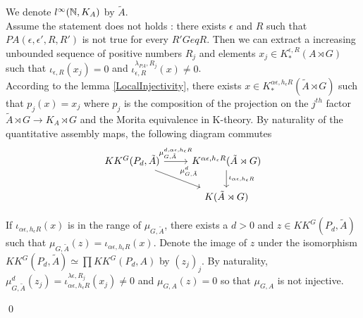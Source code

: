 \begin{dem}
We denote $l^\infty(\mathbb N,K_A)$ by $\tilde A$.\\
Assume the statement does not holds : there exists $\epsilon$ and $R$ such that $PA(\epsilon,\epsilon',R,R')$ is not true for every $R'Geq R$. Then we can extract a increasing unbounded sequence of positive numbers $R_j$ and elements $x_j\in K_*^{\epsilon,R}(A\rtimes G)$ such that $\iota_{\epsilon,R}(x_j)=0$ and $\iota_{\epsilon,R}^{\lambda_{PA},R_j}(x)\neq 0$. \\
According to the lemma \ref{LocalInjectivity}, there exists $x\in K_*^{\alpha\epsilon,h_\epsilon R}(\tilde A\rtimes G)$ such that $p_j(x)=x_j$ where $p_j$ is the composition of the projection on the $j^{th}$ factor $\tilde A \rtimes G \rightarrow K_A \rtimes G$ and the Morita equivalence in K-theory.
By naturality of the quantitative assembly maps, the following diagram commutes
\[\begin{tikzcd}
KK^G(P_d,\tilde A) \arrow{r}{\mu_{G,\tilde A}^{d,\alpha\epsilon, h_\epsilon R}} \arrow{rd}{\mu_{G,\tilde A}^d} & K^{\alpha\epsilon,h_\epsilon R}(\tilde A\rtimes G) \arrow{d}{\iota_{\alpha\epsilon, h_\epsilon R}}\\
                                                      \                          & K(\tilde A\rtimes G)
\end{tikzcd}\]

If $\iota_{\alpha\epsilon,h_\epsilon R}(x)$ is in the range of $\mu_{G,\tilde A}$, there exists a $d>0$ and $z\in KK^G(P_d,\tilde A)$ such that $\mu_{G,\tilde A}(z)=\iota_{\alpha\epsilon,h_\epsilon R}(x)$. Denote the image of $z$ under the isomorphism $KK^G(P_d,\tilde A) \simeq \prod KK^G(P_d,A)$ by $(z_j)_j$. By naturality, $\mu_{G,\tilde A}^d(z_j)=\iota_{\alpha\epsilon,h_\epsilon R}^{\lambda\epsilon,R_j}(x_j)\neq 0$ and $\mu_{G,A}(z)=0$ so that $\mu_{G,A}$ is not injective.

\qed
\end{dem}

